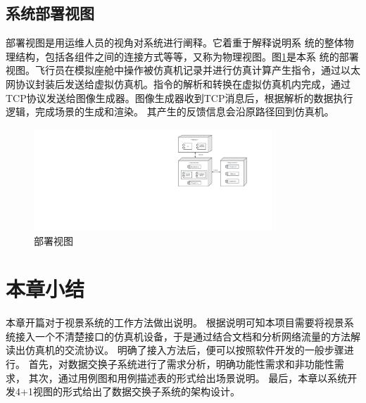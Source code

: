 \subsection{系统部署视图}
部署视图是用运维人员的视角对系统进行阐释。它着重于解释说明系
统的整体物理结构，包括各组件之间的连接方式等等，又称为物理视图。图\ref{deploydiagram}是本系
统的部署视图。飞行员在模拟座舱中操作被仿真机记录并进行仿真计算产生指令，通过以太网协议封装后发送给虚拟仿真机。指令的解析和转换在虚拟仿真机内完成，通过TCP协议发送给图像生成器。图像生成器收到TCP消息后，根据解析的数据执行逻辑，完成场景的生成和渲染。
其产生的反馈信息会沿原路径回到仿真机。
\begin{figure}[h]
    \begin{center}
        \includegraphics[width=0.8\textwidth]{pictures/deploydiagram.pdf}
        \caption{部署视图}
        \label{deploydiagram}
    \end{center}
\end{figure}

\section{本章小结}
本章开篇对于视景系统的工作方法做出说明。
根据说明可知本项目需要将视景系统接入一个不清楚接口的仿真机设备，于是通过结合文档和分析网络流量的方法解读出仿真机的交流协议。
明确了接入方法后，便可以按照软件开发的一般步骤进行。
首先，对数据交换子系统进行了需求分析，明确功能性需求和非功能性需求，
其次，通过用例图和用例描述表的形式给出场景说明。
最后，本章以系统开发4+1视图的形式给出了数据交换子系统的架构设计。
